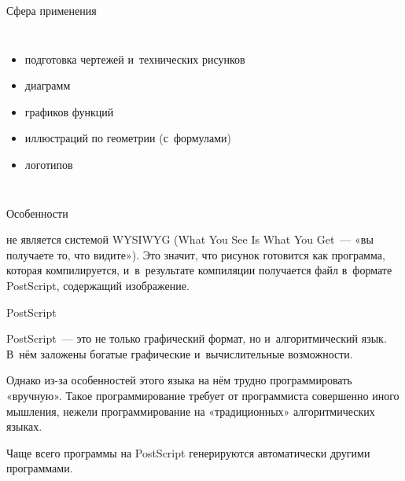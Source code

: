 \begin{frame}{Сфера применения }

\begin{columns}

\begin{itemize}
\item
\alert<1>{подготовка чертежей и~технических рисунков}
\item
\alert<2>{диаграмм}
\item
\alert<3>{графиков функций}
\item
\alert<4>{иллюстраций по геометрии (с~формулами)}
\item
\alert<5>{логотипов}
\end{itemize}


\end{columns}


\end{frame}


\begin{frame}{Особенности }

 \alert{не} является системой WYSIWYG (What You See Is What
You Get~— «вы получаете то, что видите»). Это значит, что рисунок готовится как
программа, которая компилируется, и~в~результате компиляции получается файл
в~формате PostScript, содержащий изображение.

\end{frame}


\begin{frame}{PostScript}

PostScript~— это не только графический формат, но и~алгоритмический язык. В~нём
заложены богатые графические и~вычислительные возможности.

Однако из-за особенностей этого языка на нём трудно программировать «вручную».
Такое программирование требует от программиста совершенно иного мышления,
нежели программирование на «традиционных» алгоритмических языках.

Чаще всего программы на PostScript генерируются автоматически другими
программами.

\end{frame}

